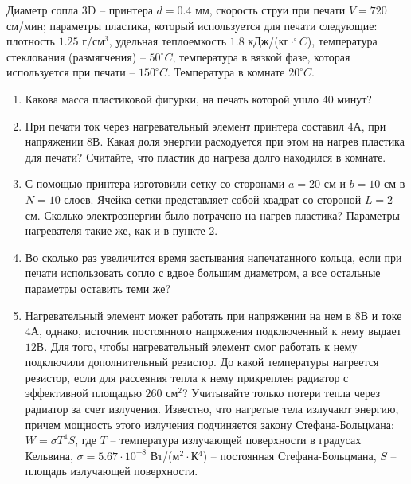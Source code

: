 
Диаметр сопла 3D – принтера $d = 0.4$ мм, скорость струи при печати $V = 720$ см/мин; параметры пластика, который используется для печати следующие: плотность $1.25$ г/см$^3$, удельная теплоемкость $1.8$ кДж/(кг$\cdot^{\circ}C$), температура стеклования (размягчения) – $50^{\circ}C$, температура в вязкой фазе, которая используется при печати – $150^{\circ}C$. Температура в комнате $20^{\circ}C$.

\begin{enumerate}
    \item Какова масса пластиковой фигурки, на печать которой ушло 40 минут?
    \item При печати ток через нагревательный элемент принтера составил $4А$, при напряжении $8В$. Какая доля энергии расходуется при этом на нагрев пластика для печати? Считайте, что пластик до нагрева долго находился в комнате.
    \item С помощью принтера изготовили сетку со сторонами $a= 20$ см и $b = 10$ см в $N = 10$ слоев. Ячейка сетки представляет собой квадрат со стороной $L = 2$ см. Сколько электроэнергии было потрачено на нагрев пластика? Параметры нагревателя такие же, как и в пункте 2.
    \item Во сколько раз увеличится время застывания напечатанного кольца, если при печати использовать сопло с вдвое большим диаметром, а все остальные параметры оставить теми же?
    \item Нагревательный элемент может работать при напряжении на нем в $8В$ и токе $4А$, однако, источник постоянного напряжения подключенный к нему выдает $12В$. Для того, чтобы нагревательный элемент смог работать к нему подключили дополнительный резистор. До какой температуры нагреется резистор, если для рассеяния тепла к нему прикреплен радиатор с эффективной площадью $260$ см$^2$? Учитывайте только потери тепла через радиатор за счет излучения. Известно, что нагретые тела излучают энергию, причем мощность этого излучения подчиняется закону Стефана-Больцмана: $W=\sigma T^4S$,  где $T$ – температура излучающей поверхности в градусах Кельвина, $\sigma=5.67\cdot10^{-8}$ Вт/(м$^2\cdot$К$^4$) – постоянная Стефана-Больцмана, $S$ – площадь излучающей поверхности.
\end{enumerate}